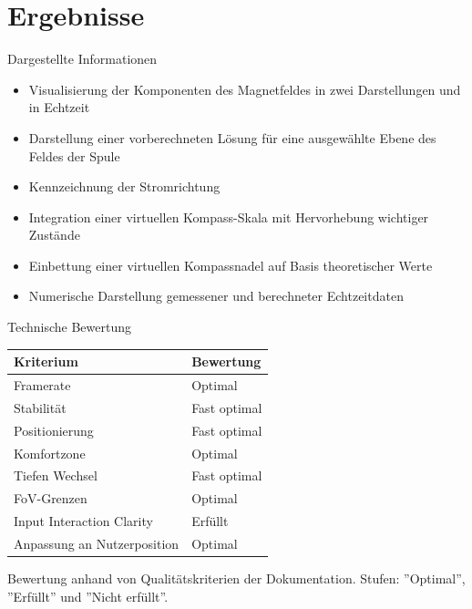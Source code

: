 \part{Ergebnisse}
\label{part:results}
\begin{frame}[fragile]{Dargestellte Informationen}
\begin{itemize}
	\item Visualisierung der Komponenten des Magnetfeldes in zwei Darstellungen und in Echtzeit
	\item Darstellung einer vorberechneten Lösung für eine ausgewählte Ebene des Feldes der Spule
	\item Kennzeichnung der Stromrichtung
	\item Integration einer virtuellen Kompass-Skala mit Hervorhebung wichtiger Zustände
	\item Einbettung einer virtuellen Kompassnadel auf Basis theoretischer Werte
	\item Numerische Darstellung gemessener und berechneter Echtzeitdaten
\end{itemize}
\end{frame}

\begin{frame}[fragile]{Technische Bewertung}

\setlength\extrarowheight{1pt}
\def\arraystretch{1.1}
\begin{table}
	\centering
	\begin{tabular}{l{5cm}|l}
		Kriterium & Bewertung \\
		\hline
		\hline
		Framerate & Optimal\\
		\hline
		Stabilität & Fast optimal\\
		\hline
		Positionierung & Fast optimal\\
		\hline
		Komfortzone & Optimal\\
		\hline
		Tiefen Wechsel & Fast optimal\\
		\hline
		FoV-Grenzen & Optimal\\
		\hline
		Input Interaction Clarity & Erfüllt\\
		\hline
		Anpassung an Nutzerposition & Optimal\\
	\end{tabular}
\end{table}
\scriptsize Bewertung anhand von Qualitätskriterien der Dokumentation. Stufen: ''Optimal'', ''Erfüllt'' und ''Nicht erfüllt''.
\end{frame}


